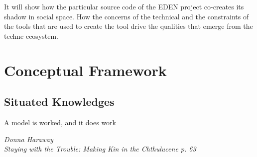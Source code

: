 \documentclass[a4paper,man,natbib]{apa6}
\begin{document}
   It will show how the particular source code of the \acrshort{EDEN} project co-creates its shadow in social space. How the concerns of the technical and the constraints of the tools that are used to create the tool drive the qualities that emerge from the techne ecosystem. 
   \pagebreak
   \section*{Conceptual Framework}
   \subsection*{Situated Knowledges}

   \epigraph{A model is worked, and it does work}{\textit{Donna Haraway \\ Staying with the Trouble: Making Kin in the Chthulucene p. 63}}
\end{document}
